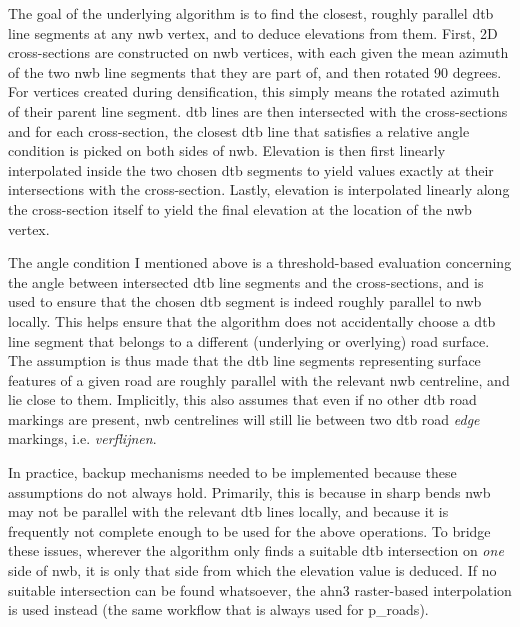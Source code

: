 The goal of the underlying algorithm is to find the closest, roughly parallel \ac{dtb} line segments at any \ac{nwb} vertex, and to deduce elevations from them. First, 2D cross-sections are constructed on \ac{nwb} vertices, with each given the mean azimuth of the two \ac{nwb} line segments that they are part of, and then rotated 90 degrees. For vertices created during densification, this simply means the rotated azimuth of their parent line segment. \ac{dtb} lines are then intersected with the cross-sections and for each cross-section, the closest \ac{dtb} line that satisfies a relative angle condition is picked on both sides of \ac{nwb}. Elevation is then first linearly interpolated inside the two chosen \ac{dtb} segments to yield values exactly at their intersections with the cross-section. Lastly, elevation is interpolated linearly along the cross-section itself to yield the final elevation at the location of the \ac{nwb} vertex.

The angle condition I mentioned above is a threshold-based evaluation concerning the angle between intersected \ac{dtb} line segments and the cross-sections, and is used to ensure that the chosen \ac{dtb} segment is indeed roughly parallel to \ac{nwb} locally. This helps ensure that the algorithm does not accidentally choose a \ac{dtb} line segment that belongs to a different (underlying or overlying) road surface. The assumption is thus made that the \ac{dtb} line segments representing surface features of a given road are roughly parallel with the relevant \ac{nwb} centreline, and lie close to them. Implicitly, this also assumes that even if no other \ac{dtb} road markings are present, \ac{nwb} centrelines will still lie between two \ac{dtb} road \textit{edge} markings, i.e. \textit{verflijnen}.

In practice, backup mechanisms needed to be implemented because these assumptions do not always hold. Primarily, this is because in sharp bends \ac{nwb} may not be parallel with the relevant \ac{dtb} lines locally, and because it is frequently not complete enough to be used for the above operations. To bridge these issues, wherever the algorithm only finds a suitable \ac{dtb} intersection on \textit{one} side of \ac{nwb}, it is only that side from which the elevation value is deduced. If no suitable intersection can be found whatsoever, the \ac{ahn3} raster-based interpolation is used instead (the same workflow that is always used for \ac{p_roads}).

